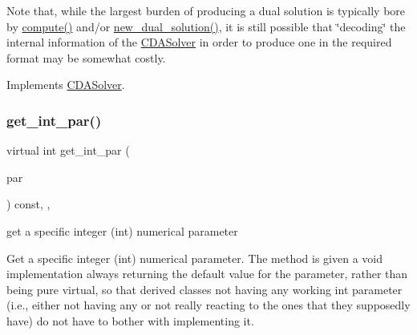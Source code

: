 Note that, while the largest burden of producing a dual solution is typically bore by \mbox{\hyperlink{class_s_m_spp__di__unipi__it_1_1_m_c_f_solver_afc8ff54ab05d22f4cca0fb0bfbeb7a49}{compute()}} and/or \mbox{\hyperlink{class_s_m_spp__di__unipi__it_1_1_m_c_f_solver_aa78ff49c515c8c6e2da6216d104dc219}{new\+\_\+dual\+\_\+solution()}}, it is still possible that \char`\"{}decoding\char`\"{} the internal information of the \mbox{\hyperlink{class_s_m_spp__di__unipi__it_1_1_c_d_a_solver}{C\+D\+A\+Solver}} in order to produce one in the required format may be somewhat costly. 

Implements \mbox{\hyperlink{class_s_m_spp__di__unipi__it_1_1_c_d_a_solver_a347d37171494bf83416a48b279b94d5a}{C\+D\+A\+Solver}}.

\mbox{\label{class_s_m_spp__di__unipi__it_1_1_m_c_f_solver_aaaa5e72533153b149c26c1cc7ab1fe70}} 
\subsubsection{\texorpdfstring{get\+\_\+int\+\_\+par()}{get\_int\_par()}}
{\footnotesize\ttfamily virtual int get\+\_\+int\+\_\+par (\begin{DoxyParamCaption}\item[{const \mbox{\hyperlink{class_s_m_spp__di__unipi__it_1_1_thin_compute_interface_aa3d710629ad8c434286726ad810c3b47}{idx\+\_\+type}}}]{par }\end{DoxyParamCaption}) const\hspace{0.3cm}{\ttfamily [inline]}, {\ttfamily [override]}, {\ttfamily [virtual]}}



get a specific integer (int) numerical parameter 

Get a specific integer (int) numerical parameter. The method is given a void implementation always returning the default value for the parameter, rather than being pure virtual, so that derived classes not having any working int parameter (i.\+e., either not having any or not really reacting to the ones that they supposedly have) do not have to bother with implementing it. 

